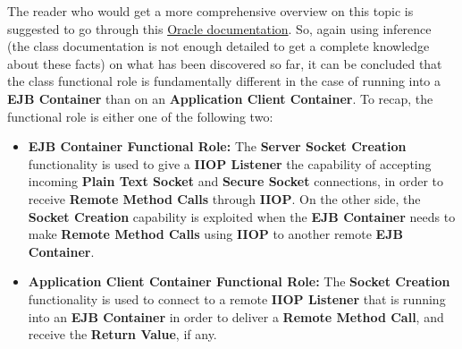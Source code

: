%
The reader who would get a more comprehensive overview on this topic is suggested to go through this \href{https://docs.oracle.com/javaee/7/firstcup/java-ee002.htm}{Oracle documentation}.
So, again using inference (the class documentation is not enough detailed to get a complete knowledge about these facts) on what has been discovered so far, it can be concluded that the class functional role is fundamentally different in the case of running into a \textbf{EJB Container} than on an \textbf{Application Client Container}.
To recap, the functional role is either one of the following two:
\begin{itemize}
	\item \textbf{EJB Container Functional Role:}
		The \textbf{Server Socket Creation} functionality is used to give a \textbf{IIOP Listener} the capability of accepting incoming \textbf{Plain Text Socket} and \textbf{Secure Socket} connections, in order to receive \textbf{Remote Method Calls} through \textbf{IIOP}.
		On the other side, the \textbf{Socket Creation} capability is exploited when the \textbf{EJB Container} needs to make \textbf{Remote Method Calls} using \textbf{IIOP} to another remote \textbf{EJB Container}.
	\item \textbf{Application Client Container Functional Role:}
		The \textbf{Socket Creation} functionality is used to connect to a remote \textbf{IIOP Listener} that is running into an \textbf{EJB Container} in order to deliver a \textbf{Remote Method Call}, and receive the \textbf{Return Value}, if any.
\end{itemize}
%
